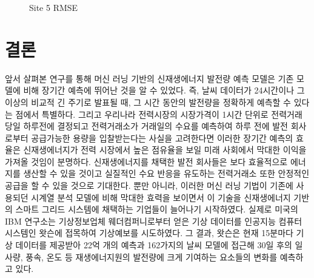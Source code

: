 \documentclass{article}
\begin{document}
\begin{figure}[!h]
\centering
{}
\caption{Site 5 RMSE}
\end{figure}



\section{결론}
앞서 살펴본 연구를 통해 머신 러닝 기반의 신재생에너지 발전량 예측 모델은 기존 모델에 비해 장기간 예측에 뛰어난 것을 알 수 있었다. 즉, 날씨 데이터가 24시간이나 그 이상의 비교적 긴 주기로 발표될 때, 그 시간 동안의 발전량을 정확하게 예측할 수 있다는 점에서 특별하다. 그리고 우리나라 전력시장의 시장가격이 1시간 단위로 전력거래 당일 하루전에 결정되고 전력거래소가 거래일의 수요를 예측하여 하루 전에 발전 회사로부터 공급가능한 용량을 입찰받는다는 사실을 고려한다면 이러한 장기간 예측의 효율은 신재생에너지가 전력 시장에서 높은 점유율을 보일 미래 사회에서 막대한 이익을 가져올 것임이 분명하다. 신재생에너지를 채택한 발전 회사들은 보다 효율적으로 에너지를 생산할 수 있을 것이고 실질적인 수요 반응을 유도하는 전력거래소 또한 안정적인 공급을 할 수 있을 것으로 기대한다. \newline
뿐만 아니라, 이러한 머신 러닝 기법이 기존에 사용되던 시계열 분석 모델에 비해 막대한 효력을 보이면서 이 기술을 신재생에너지 기반의 스마트 그리드 시스템에 채택하는 기업들이 늘어나기 시작하였다. 실제로 미국의 IBM 연구소는 기상정보업체 웨더컴퍼니로부터 얻은 기상 데이터를 인공지능 컴퓨터 시스템인 왓슨에 접목하여 기상예보를 시도하였다. 그 결과, 왓슨은 현재 15분마다 기상 데이터를 제공받아 22억 개의 예측과 162가지의 날씨 모델에 접근해 30일 후의 일사량, 풍속, 온도 등 재생에너지원의 발전량에 크게 기여하는 요소들의 변화를 예측하고 있다.
\end{document}
